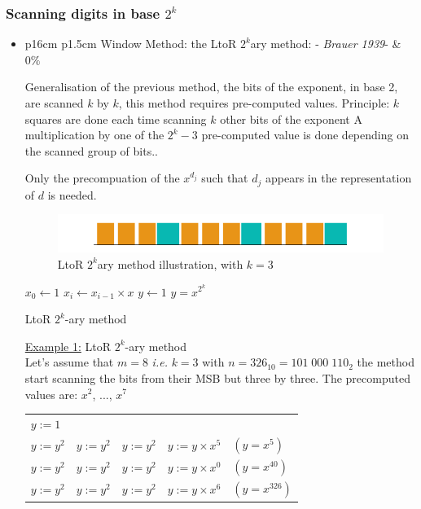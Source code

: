 \newpage
\subsubsection{Scanning digits in base $2^k$}
\begin{itemize}
\item  	
		\begin{tabularx}{\linewidth}{ p{16cm} p{1.5cm}}
		Window Method: the LtoR $2^k$ary method: -
		\textit{Brauer 1939}-  & $0\%$  
		\end{tabularx}	
			\noindent
				Generalisation of the previous method, the bits of the exponent, in base 2, 
				are scanned $k$ by $k$, this method requires pre-computed values.
				Principle: $k$ squares are done each time scanning $k$ other bits of the exponent
				A multiplication by one of the $2^{k}-3$ pre-computed value is done 
				depending on the scanned group of bits..

				Only the precompuation of the $x^{d_j}$ such that $d_j$ appears in the representation of $d$ is needed.
				
			\begin{figure}[h]
			\begin{center}
	       		\includegraphics[scale=0.33]{images/2k.png}
				\caption{LtoR $2^k$ary method illustration, with $k=3$}
			\end{center}
			\end{figure}
			\begin{algorithm}[h]
				$x_0 \leftarrow 1$	\; 				
				{						     
					 $x_i \leftarrow x_{i-1} \times x$ \;
				}
				$y \leftarrow 1$	\;
				{			 
					 $y = x^{2^k}$ \;
				}									 
				\;
				\caption{LtoR $2^k$-ary method}
			\end{algorithm}			

			\underline{Example 1:} LtoR $2^k$-ary method\\
			Let's assume that $m=8$ \textit{i.e.} $k=3$ with $n=326_{10}=101\;000\;110_2$ 
			the method start scanning the bits from their MSB but three by three.
			The precomputed values are:   $x^2$, ..., $x^7$\\
			\begin{tabularx}{\linewidth}{ p{2cm} p{2cm} p{2cm} p{8cm} p{2cm}}
				$y:= 1$ & & & &\\
				$y := y ^2$ & $y := y ^2$ & $y := y ^2$ & $y := y  \times  x^5$ & $(y=x^5)$ \\
				$y := y ^2$ & $y := y ^2$ & $y := y ^2$ & $y := y  \times  x^0$ & $(y=x^{40})$\\
				$y := y ^2$ & $y := y ^2$ & $y := y ^2$ & $y := y  \times  x^6$ & $(y=x^{326})$
			\end{tabularx}
			\vspace{3mm}
			

\end{itemize}
